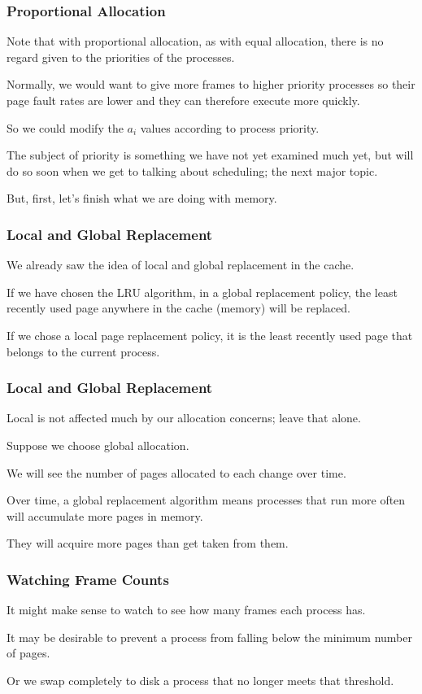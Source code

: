 \begin{frame}
\frametitle{Proportional Allocation}

Note that with proportional allocation, as with equal allocation, there is no regard given to the priorities of the processes. 

Normally, we would want to give more frames to higher priority processes so their page fault rates are lower and they can therefore execute more quickly. 

So we could modify the $a_{i}$ values according to process priority. 

The subject of priority is something we have not yet examined much yet, but will do so soon when we get to talking about scheduling; the next major topic. 

But, first, let's finish what we are doing with memory.

\end{frame}

\begin{frame}
\frametitle{Local and Global Replacement}

We already saw the idea of local and global replacement in the cache. 

If we have chosen the LRU algorithm, in a global replacement policy, the least recently used page anywhere in the cache (memory) will be replaced. 

If we chose a local page replacement policy, it is the least recently used page that belongs to the current process.

\end{frame}

\begin{frame}
\frametitle{Local and Global Replacement}

Local is not affected much by our allocation concerns; leave that alone. 

Suppose we choose global allocation. 

We will see the number of pages allocated to each change over time. 

Over time, a global replacement algorithm means processes that run more often will accumulate more pages in memory.

They will acquire more pages than get taken from them.

\end{frame}

\begin{frame}
\frametitle{Watching Frame Counts}

It might make sense to watch to see how many frames each process has. 

It may be desirable to prevent a process from falling below the minimum number of pages.

Or we swap completely to disk a process that no longer meets that threshold.


\end{frame}

